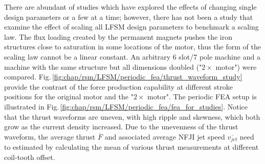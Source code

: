             
            There are abundant of studies which have explored the effects of changing single design parameters or a few at a time; however, there has not been a study that examine the effect of scaling all \acs{LFSM} design parameters to benchmark a scaling law. The flux loading created by the permanent magnets pushes the iron structures close to saturation in some locations of the motor, thus the form of the scaling law cannot be a linear constant. An arbitrary 6 slot/7 pole machine and a machine with the same structure but all dimensions doubled ("$2\times$ motor") were compared. Fig.\,\ref{fig:chap/rsm/LFSM/periodic_fea/thrust_waveform_study} provide the contrast of the force production capability at different stroke positions for the original motor and the "$2\times$ motor". The periodic \acs{FEA} setup is illustrated in Fig.\,\ref{fig:chap/rsm/LFSM/periodic_fea/fea_for_studies}. Notice that the thrust waveforms are uneven, with high ripple and skewness, which both grow as the current density increased. Due to the unevenness of the thrust waveform, the average thrust $\overline{F}$ and associated average \acs{NFJI} jet speed $\overline{v_{jet}}$ need to estimated by calculating the mean of various thrust measurements at different coil-tooth offset.
            
